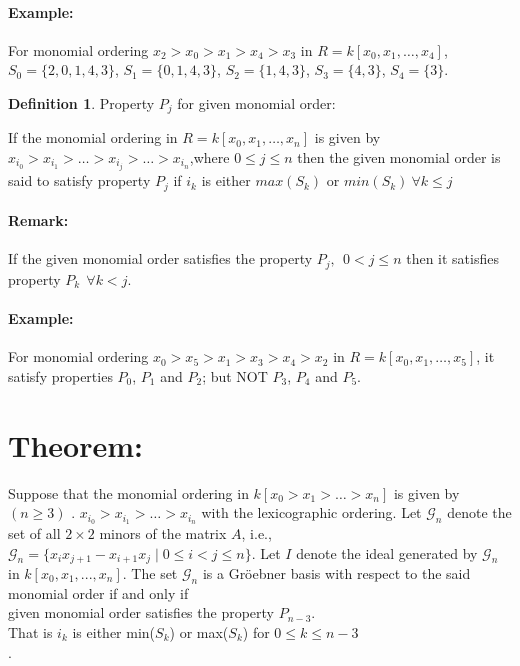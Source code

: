 \documentclass[12pt,a4paper]{article}
\theoremstyle{definition}
\newtheorem{definition}{Definition}
\begin{document}
\paragraph*{Example:}
For monomial ordering $x_2>x_0>x_1>x_4>x_3$ in $R=k[x_0, x_1, \ldots , x_4]$,\\$S_0 = \{2, 0, 1, 4, 3\}$, $S_1 = \{0, 1, 4, 3\}$, $S_2 = \{1, 4, 3\}$, $S_3 = \{4, 3\}$, $S_4 = \{3\}$.\\[1cm]

\begin{definition}{Property $P_{j}$ for given monomial order:}

\noindent If the monomial ordering in $R=k[x_0,x_1,\ldots , x_n]$ is given by $x_{i_{0}}> x_{i_{1}}> \ldots> x_{i_{j}}> \ldots> x_{i_{n}}$,where $0\leq j \leq n$  then the given monomial order is said to satisfy property $P_j$ if $i_{k}$ is either $max(S_{k})$ or $min(S_{k})\ \forall k\leq j$

\end{definition}

\paragraph*{Remark:}
If the given monomial order satisfies the property $P_j, \ \ 0< j \leq n$ then it satisfies property $P_k \ \ \forall k<j$. 

\paragraph*{Example:}
For monomial ordering $x_0>x_5>x_1>x_3>x_4>x_2$ in $R=k[x_0, x_1, \ldots , x_5]$, it satisfy properties $P_0$, $P_1$ and $P_2$; but NOT
$P_3$, $P_4$ and $P_5$.


\section*{Theorem:}

Suppose that the monomial ordering in $k[x_{0} > x_{1} > \ldots > x_{n}]$ is given by $( n \geq 3)$ .
$x_{i_{0}} > x_{i_{1}} > \ldots > x_{i_{n}} $ with the lexicographic ordering. Let $\mathcal{G}_n$ denote the set of all $2\times 2$ minors of the matrix $A$, i.e., $\mathcal{G}_n = \{x_{i}x_{j+1}-x_{i+1}x_{j} \mid 0 \leq i < j \leq n\}$. Let $I$ denote the  ideal  generated by $\mathcal{G}_n$ in $k[x_{0}, x_{1},...,x_{n}]$. The set $\mathcal{G}_n$ is a Gr\"{o}ebner basis with respect to the said monomial order if and only if \\
given monomial order satisfies the property $P_{n-3}$.\\
That is $i_{k}$ is either min($S_{k}$) or max($S_{k}$) for $0 \leq k \leq n-3$\\.
\end{document}
